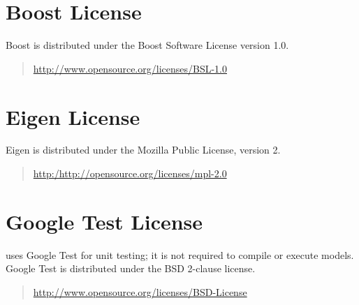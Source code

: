 \section{Boost License}

Boost is distributed under the Boost Software
License version 1.0.
%
\begin{quote}
\url{http://www.opensource.org/licenses/BSL-1.0}
\end{quote}

\section{Eigen License} 
%
Eigen is distributed under the Mozilla Public License,
version 2.
%
\begin{quote}
\url{http:/http://opensource.org/licenses/mpl-2.0}
\end{quote}

\section{Google Test License}

\CmdStan uses Google Test for unit testing; it is not required to
compile or execute models.  Google Test is distributed under the BSD
2-clause license.
%
\begin{quote}
\url{http://www.opensource.org/licenses/BSD-License}
\end{quote}

